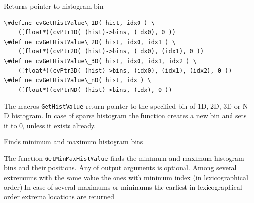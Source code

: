 \label{GetHistValue_nD}

Returns pointer to histogram bin

\begin{lstlisting}
\#define cvGetHistValue\_1D( hist, idx0 ) \
    ((float*)(cvPtr1D( (hist)->bins, (idx0), 0 ))
\#define cvGetHistValue\_2D( hist, idx0, idx1 ) \
    ((float*)(cvPtr2D( (hist)->bins, (idx0), (idx1), 0 ))
\#define cvGetHistValue\_3D( hist, idx0, idx1, idx2 ) \
    ((float*)(cvPtr3D( (hist)->bins, (idx0), (idx1), (idx2), 0 ))
\#define cvGetHistValue\_nD( hist, idx ) \
    ((float*)(cvPtrND( (hist)->bins, (idx), 0 ))
\end{lstlisting}

\begin{description}
\cvarg{ hist}{Histogram}
\end{description}

The macros \texttt{GetHistValue} return pointer to the specified bin of 1D, 2D, 3D or N-D histogram. In case of sparse histogram the function creates a new bin and sets it to 0, unless it exists already.


\label{GetMinMaxHistValue}

Finds minimum and maximum histogram bins


\begin{description}
\end{description}

The function \texttt{GetMinMaxHistValue} finds the minimum and
maximum histogram bins and their positions. Any of output arguments is
optional. Among several extremums with the same value the ones with
minimum index (in lexicographical order) In case of several maximums
or minimums the earliest in lexicographical order extrema locations
are returned.

